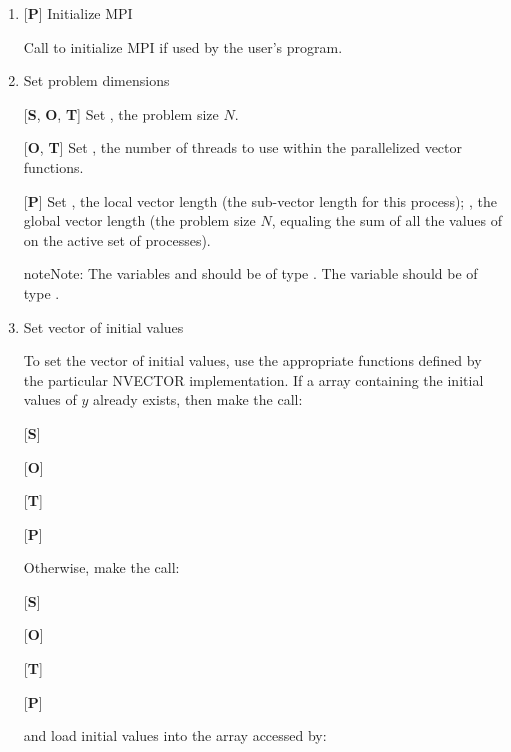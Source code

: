 \documentclass[letterpaper,10pt,english]{sphinxmanual}
\begin{document}
\begin{enumerate}
\item {} 
{[}\textbf{P}{]} Initialize MPI

Call  to initialize MPI if used by the user's program.

\item {} 
Set problem dimensions

{[}\textbf{S}, \textbf{O}, \textbf{T}{]} Set , the problem size \(N\).

{[}\textbf{O}, \textbf{T}{]} Set , the number of threads to use
within the parallelized vector functions.

{[}\textbf{P}{]} Set , the local vector length (the sub-vector length
for this process); , the global vector length (the problem size
\(N\), equaling the sum of all the values of  on the
active set of processes).

\begin{notice}{note}{Note:}
The variables  and  should be of type
.  The variable  should be of type
.
\end{notice}

\item {} 
Set vector of initial values

To set the vector  of initial values, use the appropriate
functions defined by the particular NVECTOR implementation.  If a
 array  containing the initial values of \(y\)
already exists, then make the call:

{[}\textbf{S}{]} 

{[}\textbf{O}{]} 

{[}\textbf{T}{]} 

{[}\textbf{P}{]} 

Otherwise, make the call:

{[}\textbf{S}{]} 

{[}\textbf{O}{]} 

{[}\textbf{T}{]} 

{[}\textbf{P}{]} 

and load initial values into the array accessed by:


\end{enumerate}
\end{document}
